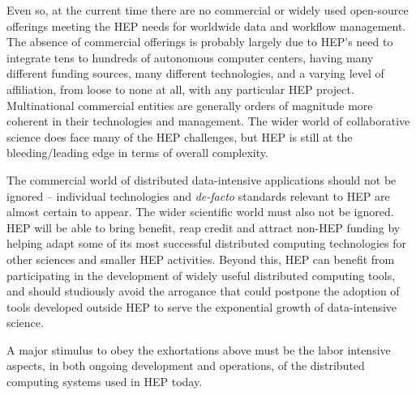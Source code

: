 Even so, at the current time there are no commercial or widely used open-source 
offerings meeting the HEP needs for worldwide data and workflow management.  
The absence of commercial offerings is probably largely due to HEP’s need to 
integrate tens to hundreds of autonomous computer centers, having many different 
funding sources, many different technologies, and a varying level of affiliation, 
from loose to none at all, with any particular HEP project.  Multinational commercial 
entities are generally orders of magnitude more coherent in their technologies and 
management.  The wider world of collaborative science does face many of the HEP 
challenges, but HEP is still at the bleeding/leading edge in terms of overall 
complexity.

The commercial world of distributed data-intensive applications should not be 
ignored -- individual technologies and {\it de-facto} standards relevant to HEP are 
almost certain to appear.  The wider scientific world must also not be ignored.  
HEP will be able to bring benefit, reap credit and attract non-HEP funding by 
helping adapt some of its most successful distributed computing technologies 
for other sciences and smaller HEP activities. Beyond this, HEP can benefit 
from participating in the development of widely useful distributed computing 
tools, and should studiously avoid the arrogance that could postpone the adoption 
of tools developed outside HEP to serve the exponential growth of data-intensive science.

A major stimulus to obey the exhortations above must be the labor intensive aspects, 
in both ongoing development and operations, of the distributed computing systems 
used in HEP today.

